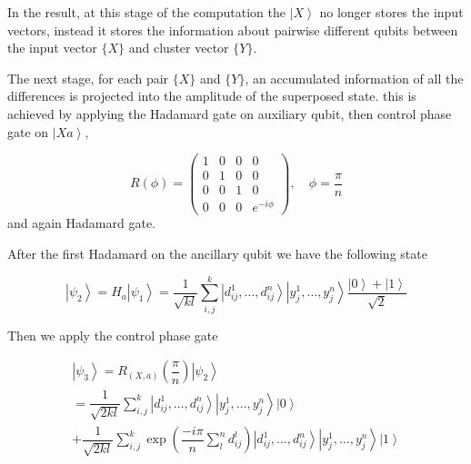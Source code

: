 \documentclass[pra,showkeys,twocolumn,showpacs]{revtex4-1}
\begin{document}
In the result, at this stage of the computation the $\left| X \right\rangle$ no longer stores the input vectors, instead it stores the information about pairwise different qubits between the input vector $\{X\}$ and cluster vector $\{Y\}$. 


The next stage, for each pair $\{X\}$ and $\{Y\}$, an accumulated information of all the differences is projected into the amplitude of the superposed state. this is achieved by applying the Hadamard gate on auxiliary qubit, then control phase gate on $\left| Xa \right\rangle$,  

\begin{equation}
    \label{eq:control_phase_rotation}
    R(\phi) = 
    \begin{pmatrix}
        1 & 0 & 0 & 0 \\
        0 & 1 & 0 & 0 \\
        0 & 0 & 1 & 0 \\
        0 & 0 & 0 & e^{-i\phi}
    \end{pmatrix},
    \quad \phi = \frac{\pi}{n}
\end{equation}
and again Hadamard gate.


After the first Hadamard on the ancillary qubit we have the following state

\begin{equation}
    \left| \psi_2 \right\rangle = H_a\left| \psi_1 \right\rangle = 
    \frac{1}{\sqrt{kl}} \sum\limits_{i, j}^{k} 
    \left| d^1_{ij}, \dots, d^n_{ij} \right\rangle 
    \left| y^1_j, \dots, y^n_j \right\rangle
    \dfrac{\left| 0 \right\rangle + \left| 1 \right\rangle}{\sqrt{2}}
\end{equation}

Then we apply the control phase gate

\begin{multline}
    \left| \psi_3 \right\rangle = R_{(X,a)}\left(\dfrac{\pi}{n}\right)\left| \psi_2 \right\rangle
    \\ = \dfrac{1}{\sqrt{2kl}}
				\sum\limits_{i, j}^{k} 
				\left| d^1_{ij}, \dots, d^n_{ij} \right\rangle 
        \left| y^1_j, \dots, y^n_j \right\rangle 
        \left| 0 \right\rangle
        \\ + \dfrac{1}{\sqrt{2kl}}
				\sum\limits_{i, j}^{k}
        \exp\left(\dfrac{-i \pi}{n}\sum\limits_l^n d^l_{ij} \right)
        \left| d^1_{ij}, \dots, d^n_{ij} \right\rangle 
        \left| y^1_j, \dots, y^n_j \right\rangle 
        \left| 1 \right\rangle
\end{multline}
\end{document}
